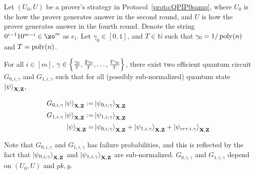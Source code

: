 \begin{lemma}\label{lem:partition2}
Let $(U_0,U)$ be a prover's strategy in Protocol~\ref{proto:QPIP0samp}, where $U_0$ is the how the prover generates answer in the second round, and $U$ is how the prover generates answer in the fourth round. Denote the string $0^{i-1}10^{m-i} \in \zo^m $ as $e_i$.  Let $\gamma_0 \in[0,1]$, and $T\in \mathbb{N}$ such that $\gamma_0=1/\operatorname*{\operatorname{poly}}(n)$ and $T=\operatorname*{\operatorname{poly}}(n)$.

 For all $i\in[m]$, $\gamma \in \left\{\frac{\gamma_0}{T},\frac{2\gamma_0}{T},\dots,\frac{T\gamma_0}{T}\right\}$, there exist two efficient quantum circuit $G_{0,i,\gamma}$ and $G_{1,i,\gamma}$  such that for all (possibly sub-normalized)  quantum state $\ket{\psi}_{\mathbf{X},\mathbf{Z}}$,  

\begin{align}
    G_{0,i,\gamma}\ket{\psi}_{\mathbf{X},\mathbf{Z}} :=& \ket{\psi_{0,i,\gamma}}_{\mathbf{X},\mathbf{Z}} \\ G_{1,i,\gamma}\ket{\psi}_{\mathbf{X},\mathbf{Z}} :=& \ket{\psi_{1,i,\gamma}}_{\mathbf{X},\mathbf{Z}}  \\
    \ket{\psi}_{\mathbf{X},\mathbf{Z}} =&   \ket{\psi_{0,i,\gamma}}_{\mathbf{X},\mathbf{Z}}+ \ket{\psi_{1,i,\gamma}}_{\mathbf{X},\mathbf{Z}}+\ket{\psi_{err,i,\gamma}}_{\mathbf{X},\mathbf{Z}}
\end{align}


 

 
  Note that $G_{0,i,\gamma}$ and $G_{1,i,\gamma}$ has failure probabilities, and this is reflected by the fact that $\ket{\psi_{0,i,\gamma}}_{\mathbf{X},\mathbf{Z}}$ and $\ket{\psi_{1,i,\gamma}}_{\mathbf{X},\mathbf{Z}}$ are  sub-normalized. $G_{0,i,\gamma}$ and $G_{1,i,\gamma}$ depend on $(U_0,U)$ and $pk,y$. 


\end{lemma}
